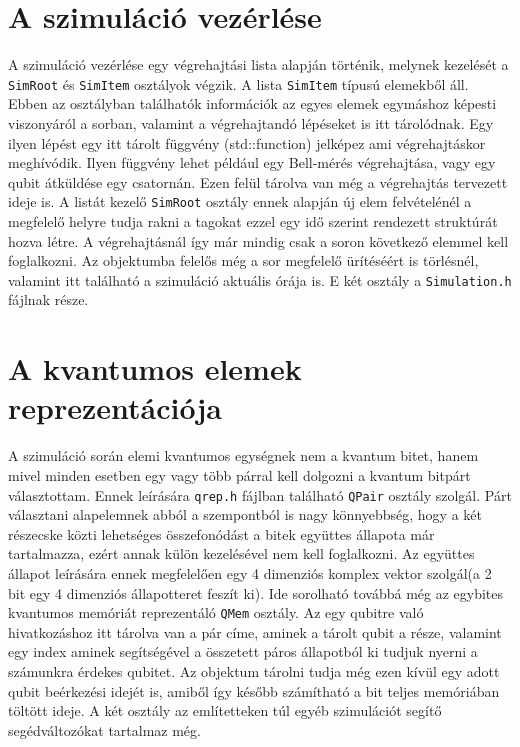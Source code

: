 \section{A szimuláció vezérlése}
A szimuláció vezérlése egy végrehajtási lista alapján történik, melynek kezelését a \texttt{SimRoot} és \texttt{SimItem} osztályok végzik. A lista \texttt{SimItem} típusú elemekből áll. Ebben az osztályban találhatók információk az egyes elemek egymáshoz képesti viszonyáról a sorban, valamint a végrehajtandó lépéseket is itt tárolódnak. Egy ilyen lépést egy itt tárolt függvény (std::function) jelképez ami végrehajtáskor meghívódik. Ilyen függvény lehet például egy Bell-mérés végrehajtása, vagy egy qubit átküldése egy csatornán. Ezen felül tárolva van még a végrehajtás tervezett ideje is. A listát kezelő \texttt{SimRoot} osztály ennek alapján új elem felvételénél a megfelelő helyre tudja rakni a tagokat ezzel egy idő szerint rendezett struktúrát hozva létre. A végrehajtásnál így már mindig csak a soron következő  elemmel kell foglalkozni.  Az objektumba felelős még a sor megfelelő ürítéséért is törlésnél, valamint itt található a szimuláció aktuális órája is.
E két osztály a \texttt{Simulation.h} fájlnak része.

\section{A kvantumos elemek reprezentációja}

A szimuláció során elemi kvantumos egységnek nem a kvantum bitet, hanem mivel minden esetben egy vagy több párral kell dolgozni a kvantum bitpárt választottam. Ennek leírására \texttt{qrep.h} fájlban található \texttt{QPair} osztály szolgál. Párt választani alapelemnek abból a szempontból is nagy könnyebbség, hogy a két részecske közti lehetséges összefonódást a bitek együttes állapota már tartalmazza, ezért annak külön kezelésével nem kell foglalkozni. Az együttes állapot leírására ennek megfelelően egy 4 dimenziós komplex vektor szolgál(a 2 bit egy 4 dimenziós állapotteret feszít ki).  Ide sorolható továbbá még az egybites kvantumos memóriát reprezentáló \texttt{QMem} osztály. Az egy qubitre való hivatkozáshoz itt tárolva van a pár címe, aminek a tárolt qubit a része, valamint egy index aminek segítségével a összetett páros állapotból ki tudjuk nyerni a számunkra érdekes qubitet. Az objektum tárolni tudja még ezen kívül egy adott qubit beérkezési idejét is, amiből így később számítható a bit teljes memóriában töltött ideje. A két osztály az említetteken túl egyéb szimulációt segítő segédváltozókat tartalmaz még.

